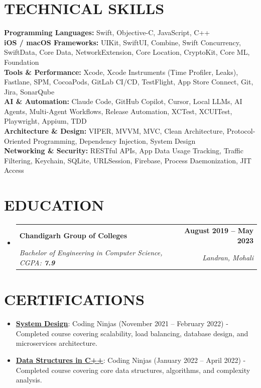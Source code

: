 \documentclass[letterpaper,11pt]{article}
\makeatletter
\newcommand{\resumeItem}[1]{
  \item\small{
    {#1 \vspace{-2pt}}
  }
}
\newcommand{\resumeSubheading}[4]{
  \vspace{-2pt}\item
    \begin{tabular*}{1.0\textwidth}[t]{l@{\extracolsep{\fill}}r}
      \textbf{\large#1} & \textbf{\small #2} \\
      \textit{\large#3} & \textit{\small #4} \\
      
    \end{tabular*}\vspace{-7pt}
}
\newcommand{\resumeSubHeadingListStart}{\begin{itemize}[leftmargin=0.0in, label={}]}
\newcommand{\resumeSubHeadingListEnd}{\end{itemize}}
\newcommand{\resumeItemListStart}{\begin{itemize}}
\newcommand{\resumeItemListEnd}{\end{itemize}\vspace{-5pt}}
\makeatother
\begin{document}
\section{TECHNICAL SKILLS}
 \begin{itemize}[leftmargin=0.15in, label={}]
    \small{\item{
     \textbf{\normalsize{Programming Languages:}}{ 
     \normalsize{Swift, Objective-C, JavaScript, C++}} \\
     \textbf{\normalsize{iOS / macOS Frameworks:}}{ 
     \normalsize{UIKit, SwiftUI, Combine, Swift Concurrency, SwiftData, Core Data, NetworkExtension, Core Location, CryptoKit, Core ML, Foundation}} \\
     \textbf{\normalsize{Tools \& Performance:}}{ 
     \normalsize{Xcode, Xcode Instruments (Time Profiler, Leaks), Fastlane, SPM, CocoaPods, GitLab CI/CD, TestFlight, App Store Connect, Git, Jira, SonarQube}} \\
     \textbf{\normalsize{AI \& Automation:}}{ 
     \normalsize{Claude Code, GitHub Copilot, Cursor, Local LLMs, AI Agents, Multi-Agent Workflows, Release Automation, XCTest, XCUITest, Playwright, Appium, TDD}} \\
     \textbf{\normalsize{Architecture \& Design:}}{ 
     \normalsize{VIPER, MVVM, MVC, Clean Architecture, Protocol-Oriented Programming, Dependency Injection, System Design}} \\
     \textbf{\normalsize{Networking \& Security:}}{ 
     \normalsize{RESTful APIs, App Data Usage Tracking, Traffic Filtering, Keychain, SQLite, URLSession, Firebase, Process Daemonization, JIT Access}}
    }}
 \end{itemize}

\section{EDUCATION}
  \resumeSubHeadingListStart
    \resumeSubheading
      {Chandigarh Group of Colleges}{August 2019 -- May 2023}
      {Bachelor of Engineering in Computer Science, CGPA: \textbf{7.9}}{Landran, Mohali}
  \resumeSubHeadingListEnd

\section{CERTIFICATIONS}
    \vspace{0pt}
    \resumeItemListStart
        \resumeItem{\normalsize{\href{http://ninjasfiles.s3.amazonaws.com/certificate18894980e4209379ac28665887f78da42bac5c2.pdf}{\textbf{System Design}}: Coding Ninjas (November 2021 -- February 2022) - Completed course covering scalability, load balancing, database design, and microservices architecture.}}
        \resumeItem{\normalsize{\href{https://ninjasfiles.s3.amazonaws.com/certificate19853580c201378561a01f48ae87f59e9220db2.pdf}{\textbf{Data Structures in C++}}: Coding Ninjas (January 2022 -- April 2022) - Completed course covering core data structures, algorithms, and complexity analysis.}}
    \resumeItemListEnd
\end{document}
